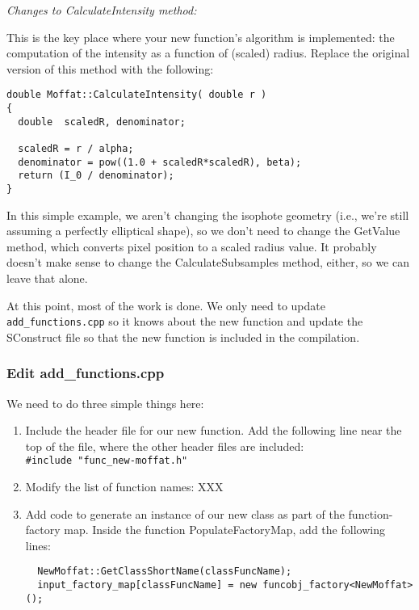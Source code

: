\documentclass[10pt]{article}
\begin{document}
\bigskip
\noindent \textit{Changes to CalculateIntensity method:}
\smallskip

This is the key place where your new function's algorithm is
implemented: the computation of the intensity as a function of (scaled)
radius.  Replace the original version of this method with the following:
\begin{verbatim}
double Moffat::CalculateIntensity( double r )
{
  double  scaledR, denominator;
  
  scaledR = r / alpha;
  denominator = pow((1.0 + scaledR*scaledR), beta);
  return (I_0 / denominator);
}
\end{verbatim}

\bigskip

In this simple example, we aren't changing the isophote geometry (i.e.,
we're still assuming a perfectly elliptical shape), so we don't need to
change the GetValue method, which converts pixel position to a scaled
radius value.  It probably doesn't make sense to change the
CalculateSubsamples method, either, so we can leave that alone.

At this point, most of the work is done.  We only need to update
\texttt{add\_functions.cpp} so it knows about the new function and
update the SConstruct file so that the new function is included in the
compilation.


\subsubsection{Edit add\_functions.cpp}

We need to do three simple things here:
\begin{enumerate}
\item Include the header file for our new function. Add the following line near
the top of the file, where the other header files are included:\\
\texttt{\#include "func\_new-moffat.h"}

\item Modify the list of function names: XXX

\item Add code to generate an instance of our new class as part of the
function-factory map. Inside the function PopulateFactoryMap, add the following lines:
\begin{verbatim}
  NewMoffat::GetClassShortName(classFuncName);
  input_factory_map[classFuncName] = new funcobj_factory<NewMoffat>();
\end{verbatim}

\end{enumerate}
\end{document}
